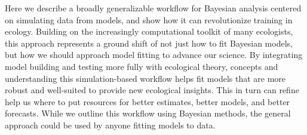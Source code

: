 \documentclass[11pt]{article}
\begin{document}
{Here we describe a broadly generalizable workflow for Bayesian analysis centered on simulating data from models, and show how it can revolutionize training in ecology. Building on the increasingly computational toolkit of many ecologists, this approach represents a ground shift of not just how to fit Bayesian models, but how we should approach model fitting to advance our science.  By integrating model building and testing more fully with ecological theory,
  concepts and understanding this simulation-based workflow helps fit models that are more robust and well-suited to provide new ecological insights. This in turn can refine help us where to put resources for better estimates, better models, and better forecasts. While we outline this workflow using Bayesian methods, the general approach could be used by anyone fitting models to data.

}
\end{document}
